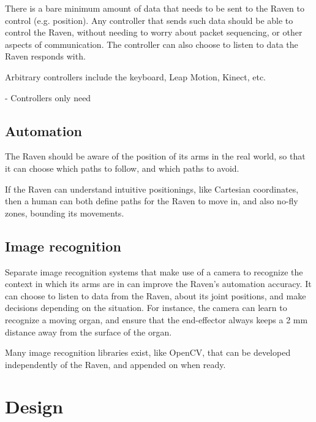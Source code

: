 \documentclass[letterpaper,twocolumn,10pt]{article}
\begin{document}
There is a bare minimum amount of data that needs to be sent to the 
Raven to control (e.g. position). Any controller that sends such 
data should be able to control the Raven, without needing to worry 
about packet sequencing, or other aspects of communication. The 
controller can also choose to listen to data the Raven responds with. 

Arbitrary controllers include the keyboard, Leap Motion, Kinect, etc.

- Controllers only need 

\subsection{Automation}
The Raven should be aware of the position of its arms in the real 
world, so that it can choose which paths to follow, and which paths 
to avoid.

If the Raven can understand intuitive positionings, like Cartesian 
coordinates, then a human can both define paths for the Raven to move 
in, and also no-fly zones, bounding its movements. 

\subsection{Image recognition}
Separate image recognition systems that make use of a camera to 
recognize the context in which its arms are in can improve the 
Raven's automation accuracy. It can choose to listen to data from 
the Raven, about its joint positions, and make decisions depending 
on the situation. For instance, the camera can learn to recognize 
a moving organ, and ensure that the end-effector always keeps a 
2 mm distance away from the surface of the organ.

Many image recognition libraries exist, like OpenCV, that can be 
developed independently of the Raven, and appended on when ready.

\section{Design}
\end{document}
